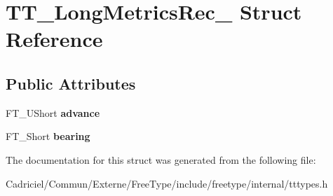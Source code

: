 \hypertarget{struct_t_t___long_metrics_rec__}{}\section{T\+T\+\_\+\+Long\+Metrics\+Rec\+\_\+ Struct Reference}
\label{struct_t_t___long_metrics_rec__}
\subsection*{Public Attributes}
\begin{DoxyCompactItemize}
\item 
F\+T\+\_\+\+U\+Short {\bfseries advance}\hypertarget{struct_t_t___long_metrics_rec___a47100e42b52486bc374f80ed2795361d}{}\label{struct_t_t___long_metrics_rec___a47100e42b52486bc374f80ed2795361d}

\item 
F\+T\+\_\+\+Short {\bfseries bearing}\hypertarget{struct_t_t___long_metrics_rec___a0d74e3eb8611b0a5e89e338af35be4da}{}\label{struct_t_t___long_metrics_rec___a0d74e3eb8611b0a5e89e338af35be4da}

\end{DoxyCompactItemize}


The documentation for this struct was generated from the following file\+:\begin{DoxyCompactItemize}
\item 
Cadriciel/\+Commun/\+Externe/\+Free\+Type/include/freetype/internal/tttypes.\+h\end{DoxyCompactItemize}
